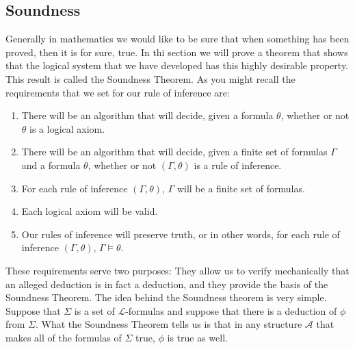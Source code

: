 \documentclass[10pt,a4paper]{article}
\newcounter{theo}
\newcommand{\curveL}{\mathcal{L}}
\newcommand{\curveA}{\mathcal{A}}
\begin{document}
                \subsection{Soundness}
                    Generally in mathematics we would like to be sure that when something has been proved, then it is for sure, true. In thi section we will prove a theorem that shows that the logical system that we have developed has this highly desirable property. This result is called the Soundness Theorem. As you might recall the requirements that we set for our rule of inference are:
                    \begin{enumerate}
                        \item There will be an algorithm that will decide, given a formula $\theta$, whether or not $\theta$ is a logical axiom.
                        \item There will be an algorithm that will decide, given a finite set of formulas $\Gamma$ and a formula $\theta$, whether or not $(\Gamma, \theta)$ is a rule of inference.
                        \item For each rule of inference $(\Gamma,\theta)$, $\Gamma$ will be a finite set of formulas.
                        \item Each logical axiom will be valid.
                        \item Our rules of inference will preserve truth, or in other words, for each rule of inference $(\Gamma,\theta)$, $\Gamma\vDash \theta$.
                    \end{enumerate}
                    These requirements serve two purposes: They allow us to verify mechanically that an alleged deduction is in fact a deduction, and they provide the basis of the Soundness Theorem. The idea behind the Soundness theorem is very simple. Suppose that $\Sigma$ is a set of $\curveL$-formulas and suppose that there is a deduction of $\phi$ from $\Sigma$. What the Soundness Theorem tells us is that in any structure $\curveA$ that makes all of the formulas of $\Sigma$ true, $\phi$ is true as well.
\end{document}

